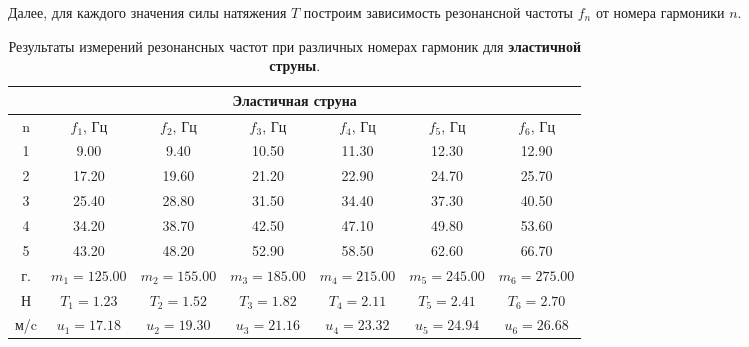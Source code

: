 \documentclass[12pt, a4paper]{article}
\begin{document}
Далее, для каждого значения силы натяжения $T$ построим зависимость резонансной частоты $f_n$ от номера гармоники $n$.

\begin{table}[H]
\begin{center}
\begin{tabular}{|c|c|c|c|c|c|c|}
\hline 
\multicolumn{7}{|c|}{Эластичная струна}\\ 
\hline 
n & $f_1$, Гц & $f_2$, Гц & $f_3$, Гц & $f_4$, Гц & $f_5$, Гц & $f_6$, Гц\\ 
\hline 
1 & 9.00 & 9.40 & 10.50 & 11.30 & 12.30 & 12.90\\ 
\hline 
2 & 17.20 & 19.60 & 21.20 & 22.90 & 24.70 & 25.70\\ 
\hline 
3 & 25.40 & 28.80 & 31.50 & 34.40 & 37.30 & 40.50\\ 
\hline 
4 & 34.20 & 38.70 & 42.50 & 47.10 & 49.80 & 53.60\\ 
\hline 
5 & 43.20 & 48.20 & 52.90 & 58.50 & 62.60 & 66.70\\ 
\hline 
г. & $m_1 = 125.00$ & $m_2 = 155.00$ & $m_3 = 185.00$ & $m_4 = 215.00$ & $m_5 = 245.00$ & $m_6 = 275.00$\\ 
\hline 
Н & $T_1 = 1.23$ & $T_2 = 1.52$ & $T_3 = 1.82$ & $T_4 = 2.11$ & $T_5 = 2.41$ & $T_6 = 2.70$\\ 
\hline 
м/c & $u_1 = 17.18$ & $u_2 = 19.30$ & $u_3 = 21.16$ & $u_4 = 23.32$ & $u_5 = 24.94$ & $u_6 = 26.68$\\ 
\hline 

\end{tabular}
\caption{Результаты измерений резонансных частот при различных номерах гармоник для \textbf{эластичной струны}.}
\label{tab:3}
\end{center}
\end{table}
\end{document}
